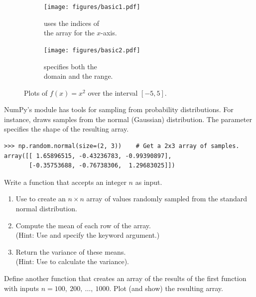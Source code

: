 \begin{figure}[H] %
\captionsetup[subfigure]{justification=centering}
\centering
\begin{subfigure}{.5\textwidth}
    \centering
    \texttt{[image: figures/basic1.pdf]}
    \caption{ uses the indices of\\the array for the $x$-axis.}
    \label{fig:basic1}
\end{subfigure}%
\begin{subfigure}{.5\textwidth}
    \centering
    \texttt{[image: figures/basic2.pdf]}
    \caption{ specifies both the\\domain and the range.}
    \label{fig:basic2}
\end{subfigure}
\caption{Plots of $f(x) = x^2$ over the interval $[-5,5]$.}
\end{figure}

\begin{problem} %
NumPy's  module has tools for sampling from probability distributions.
For instance,  draws samples from the normal (Gaussian) distribution.
The  parameter specifies the shape of the resulting array.
\begin{lstlisting}
>>> np.random.normal(size=(2, 3))    # Get a 2x3 array of samples.
array([[ 1.65896515, -0.43236783, -0.99390897],
       [-0.35753688, -0.76738306,  1.29683025]])
\end{lstlisting}
%
Write a function that accepts an integer $n$ as input.
\begin{enumerate}
\item Use  to create an $n\times n$ array of values randomly sampled from the standard normal distribution.
\item Compute the mean of each row of the array.
\\(Hint: Use  and specify the  keyword argument.)
\item Return the variance of these means.
\\(Hint: Use  to calculate the variance).
\end{enumerate}
Define another function that creates an array of the results of the first function with inputs $n = 100,\ 200,\ \ldots,\ 1000$.
Plot (and show) the resulting array.
\end{problem}

